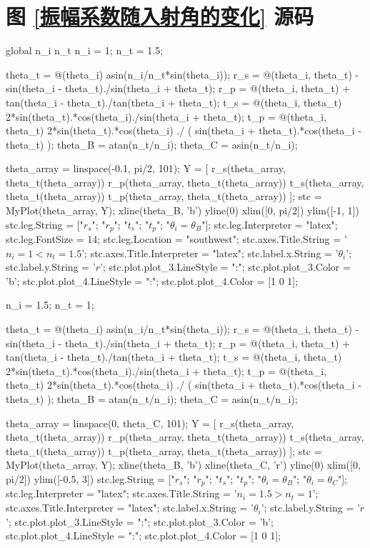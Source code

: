 \documentclass[UTF8]{report}
\theoremstyle{MyLineTheoremStyle} %
\theoremstyle{MyBlockTheoremStyle} %
\theoremstyle{MySubsubsectionStyle} %
\begin{document}
\section{图 \ref{振幅系数随入射角的变化} 源码}\label{图振幅系数随入射角的变化源码}
\begin{matlablisting}
global n_i n_t
n_i = 1;
n_t = 1.5;

theta_t = @(theta_i) asin(n_i/n_t*sin(theta_i));
r_s = @(theta_i, theta_t) - sin(theta_i - theta_t)./sin(theta_i + theta_t);
r_p = @(theta_i, theta_t) + tan(theta_i - theta_t)./tan(theta_i + theta_t);
t_s = @(theta_i, theta_t) 2*sin(theta_t).*cos(theta_i)./sin(theta_i + theta_t);
t_p = @(theta_i, theta_t) 2*sin(theta_t).*cos(theta_i) ./ ( sin(theta_i + theta_t).*cos(theta_i - theta_t) );
theta_B = atan(n_t/n_i);
theta_C = asin(n_t/n_i);

theta_array = linspace(-0.1, pi/2, 101);
Y = [
    r_s(theta_array, theta_t(theta_array))
    r_p(theta_array, theta_t(theta_array))
    t_s(theta_array, theta_t(theta_array))
    t_p(theta_array, theta_t(theta_array))
    ];
stc = MyPlot(theta_array, Y);
xline(theta_B, 'b')
yline(0)
xlim([0, pi/2])
ylim([-1, 1])
stc.leg.String = ["$r_s$"; "$r_p$"; "$t_s$"; "$t_p$"; "$\theta_i = \theta_B$"];
stc.leg.Interpreter = "latex";
stc.leg.FontSize = 14;
stc.leg.Location = "southwest";
stc.axes.Title.String = '$n_i = 1 < n_t = 1.5$';
stc.axes.Title.Interpreter = "latex";
stc.label.x.String = '$\theta_i$';
stc.label.y.String = '$r$';
stc.plot.plot_3.LineStyle = ":";
stc.plot.plot_3.Color = 'b';
stc.plot.plot_4.LineStyle = ":";
stc.plot.plot_4.Color = [1 0 1];

n_i = 1.5;
n_t = 1;

theta_t = @(theta_i) asin(n_i/n_t*sin(theta_i));
r_s = @(theta_i, theta_t) - sin(theta_i - theta_t)./sin(theta_i + theta_t);
r_p = @(theta_i, theta_t) + tan(theta_i - theta_t)./tan(theta_i + theta_t);
t_s = @(theta_i, theta_t) 2*sin(theta_t).*cos(theta_i)./sin(theta_i + theta_t);
t_p = @(theta_i, theta_t) 2*sin(theta_t).*cos(theta_i) ./ ( sin(theta_i + theta_t).*cos(theta_i - theta_t) );
theta_B = atan(n_t/n_i);
theta_C = asin(n_t/n_i);


theta_array = linspace(0, theta_C, 101);
Y = [
    r_s(theta_array, theta_t(theta_array))
    r_p(theta_array, theta_t(theta_array))
    t_s(theta_array, theta_t(theta_array))
    t_p(theta_array, theta_t(theta_array))
    ];
stc = MyPlot(theta_array, Y);
xline(theta_B, 'b')
xline(theta_C, 'r')
yline(0)
xlim([0, pi/2])
ylim([-0.5, 3])
stc.leg.String = ["$r_s$"; "$r_p$"; "$t_s$"; "$t_p$"; "$\theta_i = \theta_B$"; "$\theta_i = \theta_C$"];
stc.leg.Interpreter = "latex";
stc.axes.Title.String = '$n_i = 1.5 > n_t = 1$';
stc.axes.Title.Interpreter = "latex";
stc.label.x.String = '$\theta_i$';
stc.label.y.String = '$r$';
stc.plot.plot_3.LineStyle = ":";
stc.plot.plot_3.Color = 'b';
stc.plot.plot_4.LineStyle = ":";
stc.plot.plot_4.Color = [1 0 1];
\end{matlablisting}
\end{document}
